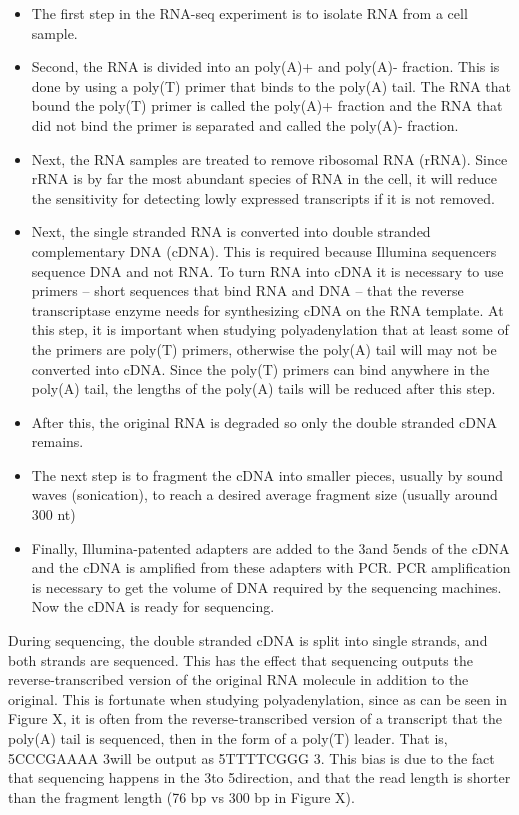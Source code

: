 \begin{itemize}
	\item The first step in the RNA-seq experiment is to isolate RNA from a cell sample.
	\item Second, the RNA is divided into an poly(A)+ and poly(A)- fraction. This is done
	by using a poly(T) primer that binds to the poly(A) tail. The RNA that bound
	the poly(T) primer is called the poly(A)+ fraction and the RNA that did not
	bind the primer is separated and called the poly(A)- fraction.
	\item Next, the RNA samples are treated to remove ribosomal RNA (rRNA). Since rRNA is
	by far the most abundant species of RNA in the cell, it will reduce the
	sensitivity for detecting lowly expressed transcripts if it is not removed.
	\item Next, the single stranded RNA is converted into double stranded complementary
	DNA (cDNA). This is required because Illumina sequencers sequence DNA and not
	RNA. To turn RNA into cDNA it is necessary to use primers -- short sequences
	that bind RNA and DNA -- that the reverse transcriptase enzyme needs for
	synthesizing cDNA on the RNA template. At this step, it is important when
	studying polyadenylation that at least some of the primers are poly(T) primers,
	otherwise the poly(A) tail will may not be converted into cDNA. Since the
	poly(T) primers can bind anywhere in the poly(A) tail, the lengths of the
	poly(A) tails will be reduced after this step.
	\item After this, the original RNA is degraded so only the double stranded cDNA
	remains.
	\item The next step is to fragment the cDNA into smaller pieces, usually by
	sound waves (sonication), to reach a desired average fragment size (usually
	around 300 nt)
	\item Finally, Illumina-patented adapters are added to the 3\p and
	5\p ends of the cDNA and the cDNA is amplified from these adapters with PCR.
	PCR amplification is necessary to get the volume of DNA required by the
	sequencing machines. Now the cDNA is ready for sequencing.
\end{itemize}

During sequencing, the double stranded cDNA is split into single strands, and
both strands are sequenced. This has the effect that sequencing outputs the
reverse-transcribed version of the original RNA molecule in addition to the
original. This is fortunate when studying polyadenylation, since as can be seen
in Figure X, it is often from the reverse-transcribed version of a transcript
that the poly(A) tail is sequenced, then in the form of a poly(T) leader. That
is, 5\p CCCGAAAA 3\p will be output as 5\p TTTTCGGG 3\p. This bias is due to
the fact that sequencing happens in the 3\p to 5\p direction, and that the read
length is shorter than the fragment length (76 bp vs 300 bp in Figure X).

